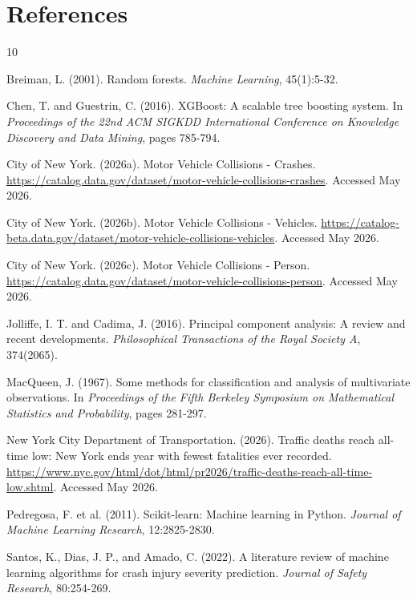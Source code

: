 \documentclass{article}
\begin{document}
\clearpage
\section*{References}
\small
\begin{thebibliography}{10}

Breiman, L. (2001). Random forests. \textit{Machine Learning}, 45(1):5-32.

Chen, T. and Guestrin, C. (2016). XGBoost: A scalable tree boosting system. In \textit{Proceedings of the 22nd ACM SIGKDD International Conference on Knowledge Discovery and Data Mining}, pages 785-794.

City of New York. (2026a). Motor Vehicle Collisions - Crashes. \url{https://catalog.data.gov/dataset/motor-vehicle-collisions-crashes}. Accessed May 2026.

City of New York. (2026b). Motor Vehicle Collisions - Vehicles. \url{https://catalog-beta.data.gov/dataset/motor-vehicle-collisions-vehicles}. Accessed May 2026.

City of New York. (2026c). Motor Vehicle Collisions - Person. \url{https://catalog.data.gov/dataset/motor-vehicle-collisions-person}. Accessed May 2026.

Jolliffe, I. T. and Cadima, J. (2016). Principal component analysis: A review and recent developments. \textit{Philosophical Transactions of the Royal Society A}, 374(2065).

MacQueen, J. (1967). Some methods for classification and analysis of multivariate observations. In \textit{Proceedings of the Fifth Berkeley Symposium on Mathematical Statistics and Probability}, pages 281-297.

New York City Department of Transportation. (2026). Traffic deaths reach all-time low: New York ends year with fewest fatalities ever recorded. \url{https://www.nyc.gov/html/dot/html/pr2026/traffic-deaths-reach-all-time-low.shtml}. Accessed May 2026.

Pedregosa, F. et al. (2011). Scikit-learn: Machine learning in Python. \textit{Journal of Machine Learning Research}, 12:2825-2830.

Santos, K., Dias, J. P., and Amado, C. (2022). A literature review of machine learning algorithms for crash injury severity prediction. \textit{Journal of Safety Research}, 80:254-269.

\end{thebibliography}
\end{document}
